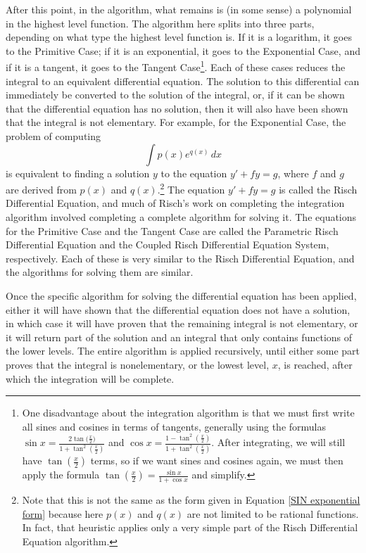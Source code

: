 After this point, in the algorithm, what remains is (in some sense) a
polynomial in the highest level function.  The algorithm here splits
into three parts, depending on what type the highest level function is.  If it
is a logarithm, it goes to the Primitive Case; if it is an exponential,
it goes to the Exponential Case, and if it is a tangent, it goes to the
Tangent Case\footnote{One disadvantage about the \gls{integration} algorithm
is that we must first write all sines and cosines in terms of tangents,
generally using the formulas $\sin{x} = \frac{2\tan{(\frac{x}{2}})}{1 +
\tan^2{(\frac{x}{2})}}$ and $\cos{x} = \frac{1 -
\tan^2{(\frac{x}{2})}}{1 + \tan^2{(\frac{x}{2})}}$.  After integrating,
we will still have $\tan{(\frac{x}{2})}$ terms, so if we want sines and
cosines again, we must then apply the formula $\tan{(\frac{x}{2})} =
\frac{\sin{x}}{1 + \cos{x}}$ and simplify.}.  Each of these cases
reduces the integral to an equivalent differential equation.  The
solution to this differential can immediately be converted to the
solution of the integral, or, if it can be shown that the differential
equation has no solution, then it will also have been shown that the
integral is not \gls{elementary}.  For example, for the Exponential
Case, the problem of computing
\begin{equation}
\label{exponential case}
\int{p(x)e^{q(x)}\,dx}
\end{equation}
is equivalent to finding a solution $y$ to the equation $y' + fy = g$,
where $f$ and $g$ are derived from $p(x)$ and $q(x)$.\footnote{Note that
this is not the same as the form given in Equation \ref{SIN exponential
form} because here $p(x)$ and $q(x)$ are not limited to be
\glspl{rational function}.  In fact, that heuristic applies only a very
simple part of the Risch Differential Equation algorithm.}  The equation
$y' + fy = g$ is called the Risch Differential Equation, and much of
Risch's work on completing the \gls{integration} algorithm involved
completing a complete algorithm for solving it.  The equations for the
Primitive Case and the Tangent Case are called the Parametric Risch
Differential Equation and the Coupled Risch Differential Equation
System, respectively.  Each of these is very similar to the Risch
Differential Equation, and the algorithms for solving them are similar.

Once the specific algorithm for solving the differential equation has
been applied, either it will have shown that the differential equation
does not have a solution, in which case it will have proven that the
remaining integral is not \gls{elementary}, or it will return part of
the solution and an integral that only contains functions of the lower
levels.  The entire algorithm is applied recursively, until either some
part proves that the integral is nonelementary, or the lowest
level, $x$, is reached, after which the \gls{integration} will be
complete.  

